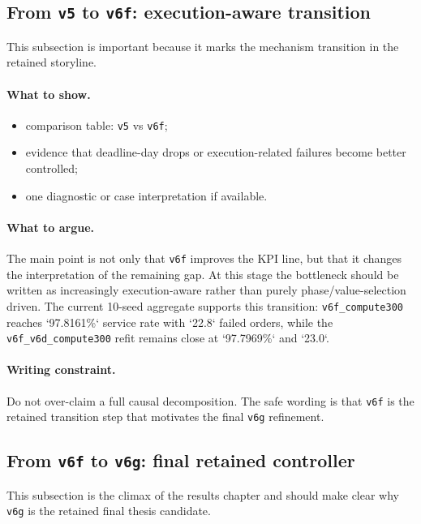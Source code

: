 \subsection{From \texttt{v5} to \texttt{v6f}: execution-aware transition}
\label{sec:results-v5-v6f}

This subsection is important because it marks the mechanism transition in the retained storyline.

\paragraph{What to show.}
\begin{itemize}
    \item comparison table: \texttt{v5} vs \texttt{v6f};
    \item evidence that deadline-day drops or execution-related failures become better controlled;
    \item one diagnostic or case interpretation if available.
\end{itemize}

\paragraph{What to argue.}
The main point is not only that \texttt{v6f} improves the KPI line, but that it changes the interpretation of the remaining gap.
At this stage the bottleneck should be written as increasingly execution-aware rather than purely phase/value-selection driven.
The current 10-seed aggregate supports this transition: \texttt{v6f\_compute300} reaches `97.8161\%` service rate with `22.8` failed orders, while the \texttt{v6f\_v6d\_compute300} refit remains close at `97.7969\%` and `23.0`.

\paragraph{Writing constraint.}
Do not over-claim a full causal decomposition.
The safe wording is that \texttt{v6f} is the retained transition step that motivates the final \texttt{v6g} refinement.

\subsection{From \texttt{v6f} to \texttt{v6g}: final retained controller}
\label{sec:results-v6f-v6g}

This subsection is the climax of the results chapter and should make clear why \texttt{v6g} is the retained final thesis candidate.


